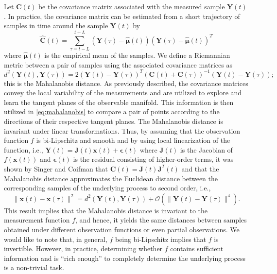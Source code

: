 \documentclass[aip,jcp,preprint]{revtex4-1}
\begin{document}
Let $\mathbf{C}(t)$ be the covariance matrix associated with the measured sample $\mathbf{Y}(t)$. In practice, the covariance matrix can be estimated from a short trajectory of samples in time around the sample $\mathbf{Y}(t)$ by
\begin{equation}
	\widehat{\mathbf{C}}(t) = \sum \limits _{\tau = t-L}^{t+L} (\mathbf{Y}(\tau) - \widehat{\boldsymbol{\mu}}(t))(\mathbf{Y}(\tau) - \widehat{\boldsymbol{\mu}}(t))^T
	\label{eq:cov}
\end{equation}
where $\widehat{\boldsymbol{\mu}}(t)$ is the empirical mean of the samples.
%
We define a Riemannian metric between a pair of samples using the associated covariance matrices as
\begin{equation}
	d^2(\mathbf{Y}(t), \mathbf{Y}(\tau)) = 2 (\mathbf{Y}(t) - \mathbf{Y}(\tau))^T(\mathbf{C}(t) + \mathbf{C}(\tau))^{-1}(\mathbf{Y}(t) - \mathbf{Y}(\tau));
	\label{eq:mahalanobis}
\end{equation}
this is the Mahalanobis distance.
%
As previously described, the covariance matrices convey the local variability of the measurements and are utilized to explore and learn the tangent planes of the observable manifold.
%
This information is then utilized in \eqref{eq:mahalanobis} to compare a pair of points according to the directions of their respective tangent planes.
%
The Mahalanobis distance is invariant under linear transformations.
%
Thus, by assuming that the observation function $f$ is bi-Lipschitz and smooth and by using local linearization of the function, i.e., $\mathbf{Y}(t) = \mathbf{J}(t) \mathbf{x}(t) + \boldsymbol{\epsilon}(t)$ where $\mathbf{J}(t)$ is the Jacobian of $f(\mathbf{x}(t))$ and $\boldsymbol{\epsilon}(t)$ is the residual consisting of higher-order terms, it was shown by Singer and Coifman \cite{singer2008non} that $\mathbf{C}(t) = \mathbf{J}(t)\mathbf{J}^T(t)$ and that the Mahalanobis distance approximates the Euclidean distance between the corresponding samples of the underlying process to second order, i.e.,
\begin{equation}
	\| \mathbf{x}(t) - \mathbf{x}(\tau) \|^2 = d^2(\mathbf{Y}(t), \mathbf{Y}(\tau)) + \mathcal{O}(\| \mathbf{Y}(t) - \mathbf{Y}(\tau)\|^4).
\end{equation}
%
This result implies that the Mahalanobis distance is invariant to the measurement function $f$, and hence,
it yields the same distances between samples obtained under different observation functions or even partial observations.
%
We would like to note that, in general, $f$ being bi-Lipschitz implies that $f$ is invertible.
%
However, in practice, determining whether $f$ contains sufficient information and is ``rich enough'' to completely determine the underlying process is a non-trivial task.
\end{document}

